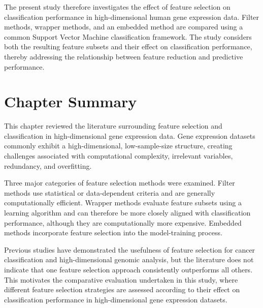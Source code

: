 The present study therefore investigates the effect of feature selection on classification performance in high-dimensional human gene expression data. Filter methods, wrapper methods, and an embedded method are compared using a common Support Vector Machine classification framework. The study considers both the resulting feature subsets and their effect on classification performance, thereby addressing the relationship between feature reduction and predictive performance.

\section{Chapter Summary}

This chapter reviewed the literature surrounding feature selection and classification in high-dimensional gene expression data. Gene expression datasets commonly exhibit a high-dimensional, low-sample-size structure, creating challenges associated with computational complexity, irrelevant variables, redundancy, and overfitting.

Three major categories of feature selection methods were examined. Filter methods use statistical or data-dependent criteria and are generally computationally efficient. Wrapper methods evaluate feature subsets using a learning algorithm and can therefore be more closely aligned with classification performance, although they are computationally more expensive. Embedded methods incorporate feature selection into the model-training process.

Previous studies have demonstrated the usefulness of feature selection for cancer classification and high-dimensional genomic analysis, but the literature does not indicate that one feature selection approach consistently outperforms all others. This motivates the comparative evaluation undertaken in this study, where different feature selection strategies are assessed according to their effect on classification performance in high-dimensional gene expression datasets.